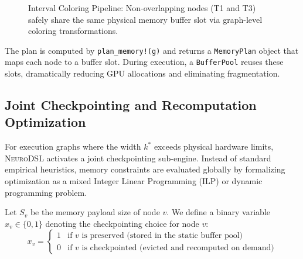 \documentclass{article}
\begin{document}
\begin{figure}[H]
\centering
{}
\caption{Interval Coloring Pipeline: Non-overlapping nodes (T1 and T3) safely share the same physical memory buffer slot via graph-level coloring transformations.}
\label{fig:memory_intervals}
\end{figure}

The plan is computed by \texttt{plan\_memory!(g)} and returns a \texttt{MemoryPlan} object that maps each node to a buffer slot. During execution, a \texttt{BufferPool} reuses these slots, dramatically reducing GPU allocations and eliminating fragmentation.

\subsection{Joint Checkpointing and Recomputation Optimization}
For execution graphs where the width $k^*$ exceeds physical hardware limits, \textsc{NeuroDSL} activates a joint checkpointing sub-engine. Instead of standard empirical heuristics, memory constraints are evaluated globally by formalizing optimization as a mixed Integer Linear Programming (ILP) or dynamic programming problem.

Let $S_v$ be the memory payload size of node $v$. We define a binary variable $x_v \in \{0, 1\}$ denoting the checkpointing choice for node $v$:
\begin{equation}
    x_v = \begin{cases} 
      1 & \text{if } v \text{ is preserved (stored in the static buffer pool)} \\
      0 & \text{if } v \text{ is checkpointed (evicted and recomputed on demand)}
   \end{cases}
\end{equation}
\end{document}
